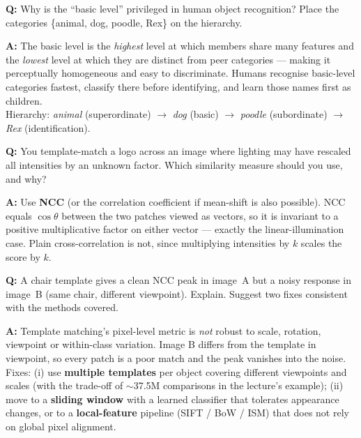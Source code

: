 \begin{exbox}
\textbf{Q:} Why is the ``basic level'' privileged in human object recognition? Place the categories \{animal, dog, poodle, Rex\} on the hierarchy.

\textbf{A:} The basic level is the \emph{highest} level at which members share many features and the \emph{lowest} level at which they are distinct from peer categories — making it perceptually homogeneous and easy to discriminate. Humans recognise basic-level categories fastest, classify there before identifying, and learn those names first as children. \\
Hierarchy: \emph{animal} (superordinate) $\to$ \emph{dog} (basic) $\to$ \emph{poodle} (subordinate) $\to$ \emph{Rex} (identification).
\end{exbox}

\begin{exbox}
\textbf{Q:} You template-match a logo across an image where lighting may have rescaled all intensities by an unknown factor. Which similarity measure should you use, and why?

\textbf{A:} Use \textbf{NCC} (or the correlation coefficient if mean-shift is also possible). NCC equals $\cos\theta$ between the two patches viewed as vectors, so it is invariant to a positive multiplicative factor on either vector — exactly the linear-illumination case. Plain cross-correlation is not, since multiplying intensities by $k$ scales the score by $k$.
\end{exbox}

\begin{exbox}
\textbf{Q:} A chair template gives a clean NCC peak in image~A but a noisy response in image~B (same chair, different viewpoint). Explain. Suggest two fixes consistent with the methods covered.

\textbf{A:} Template matching's pixel-level metric is \emph{not} robust to scale, rotation, viewpoint or within-class variation. Image B differs from the template in viewpoint, so every patch is a poor match and the peak vanishes into the noise. \\
Fixes: (i) use \textbf{multiple templates} per object covering different viewpoints and scales (with the trade-off of $\sim$37.5M comparisons in the lecture's example); (ii) move to a \textbf{sliding window} with a learned classifier that tolerates appearance changes, or to a \textbf{local-feature} pipeline (SIFT / BoW / ISM) that does not rely on global pixel alignment.
\end{exbox}

